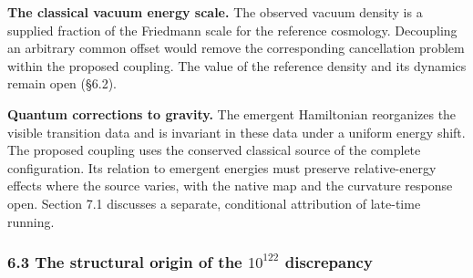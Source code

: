 \documentclass[
]{article}
\begin{document}
\textbf{The classical vacuum energy scale.} The observed vacuum density
is a supplied fraction of the Friedmann scale for the reference
cosmology. Decoupling an arbitrary common offset would remove the
corresponding cancellation problem within the proposed coupling. The
value of the reference density and its dynamics remain open (§6.2).

\textbf{Quantum corrections to gravity.} The emergent Hamiltonian
reorganizes the visible transition data and is invariant in these data
under a uniform energy shift. The proposed coupling uses the conserved
classical source of the complete configuration. Its relation to emergent
energies must preserve relative-energy effects where the source varies,
with the native map and the curvature response open. Section 7.1
discusses a separate, conditional attribution of late-time running.

\hypertarget{the-structural-origin-of-the-10122-discrepancy}{%
\subsubsection{\texorpdfstring{6.3 The structural origin of the
\(10^{122}\)
discrepancy}{6.3 The structural origin of the 10\^{}\{122\} discrepancy}}\label{the-structural-origin-of-the-10122-discrepancy}}
\end{document}
